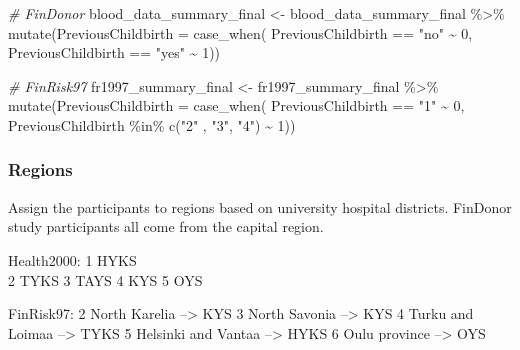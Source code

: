 \documentclass[
]{article}
\newenvironment{Shaded}{\begin{snugshade}}{\end{snugshade}}
\newcommand{\AttributeTok}[1]{\textcolor[rgb]{0.77,0.63,0.00}{#1}}
\newcommand{\CommentTok}[1]{\textcolor[rgb]{0.56,0.35,0.01}{\textit{#1}}}
\newcommand{\DecValTok}[1]{\textcolor[rgb]{0.00,0.00,0.81}{#1}}
\newcommand{\FunctionTok}[1]{\textcolor[rgb]{0.00,0.00,0.00}{#1}}
\newcommand{\NormalTok}[1]{#1}
\newcommand{\OtherTok}[1]{\textcolor[rgb]{0.56,0.35,0.01}{#1}}
\newcommand{\SpecialCharTok}[1]{\textcolor[rgb]{0.00,0.00,0.00}{#1}}
\newcommand{\StringTok}[1]{\textcolor[rgb]{0.31,0.60,0.02}{#1}}
\begin{document}
\begin{Shaded}
\begin{Highlighting}[]
\CommentTok{\# FinDonor}
\NormalTok{blood\_data\_summary\_final }\OtherTok{\textless{}{-}}\NormalTok{ blood\_data\_summary\_final }\SpecialCharTok{\%\textgreater{}\%} 
  \FunctionTok{mutate}\NormalTok{(}\AttributeTok{PreviousChildbirth =} \FunctionTok{case\_when}\NormalTok{(}
\NormalTok{    PreviousChildbirth }\SpecialCharTok{==} \StringTok{"no"} \SpecialCharTok{\textasciitilde{}} \DecValTok{0}\NormalTok{,}
\NormalTok{    PreviousChildbirth }\SpecialCharTok{==} \StringTok{"yes"} \SpecialCharTok{\textasciitilde{}} \DecValTok{1}\NormalTok{)) }

\CommentTok{\# FinRisk97}
\NormalTok{fr1997\_summary\_final }\OtherTok{\textless{}{-}}\NormalTok{ fr1997\_summary\_final }\SpecialCharTok{\%\textgreater{}\%} 
  \FunctionTok{mutate}\NormalTok{(}\AttributeTok{PreviousChildbirth =} \FunctionTok{case\_when}\NormalTok{(}
\NormalTok{    PreviousChildbirth }\SpecialCharTok{==} \StringTok{"1"} \SpecialCharTok{\textasciitilde{}} \DecValTok{0}\NormalTok{,}
\NormalTok{    PreviousChildbirth }\SpecialCharTok{\%in\%} \FunctionTok{c}\NormalTok{(}\StringTok{"2"}\NormalTok{ , }\StringTok{"3"}\NormalTok{, }\StringTok{"4"}\NormalTok{) }\SpecialCharTok{\textasciitilde{}} \DecValTok{1}\NormalTok{)) }
\end{Highlighting}
\end{Shaded}

\hypertarget{regions}{%
\subsubsection{Regions}\label{regions}}

Assign the participants to regions based on university hospital
districts. FinDonor study participants all come from the capital region.

Health2000: 1 HYKS\\
2 TYKS 3 TAYS 4 KYS 5 OYS

FinRisk97: 2 North Karelia --\textgreater{} KYS 3 North Savonia
--\textgreater{} KYS 4 Turku and Loimaa --\textgreater{} TYKS 5 Helsinki
and Vantaa --\textgreater{} HYKS 6 Oulu province --\textgreater{} OYS
\end{document}
